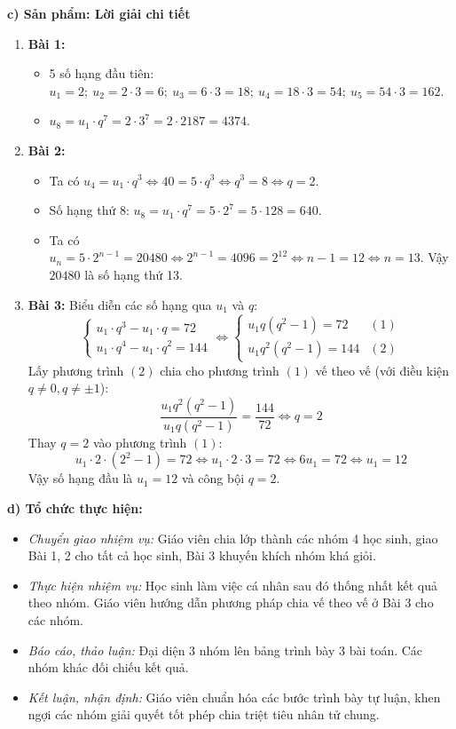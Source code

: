 \documentclass[12pt, a4paper]{article}
\begin{document}
\noindent \textbf{c) Sản phẩm: Lời giải chi tiết}
\begin{enumerate}[leftmargin=0.6cm]
    \item \textbf{Bài 1:}
    \begin{itemize}
        \item 5 số hạng đầu tiên: $u_1 = 2; \ u_2 = 2 \cdot 3 = 6; \ u_3 = 6 \cdot 3 = 18; \ u_4 = 18 \cdot 3 = 54; \ u_5 = 54 \cdot 3 = 162$.
        \item $u_8 = u_1 \cdot q^7 = 2 \cdot 3^7 = 2 \cdot 2187 = 4374$.
    \end{itemize}
    \item \textbf{Bài 2:}
    \begin{itemize}
        \item Ta có $u_4 = u_1 \cdot q^3 \iff 40 = 5 \cdot q^3 \iff q^3 = 8 \iff q = 2$.
        \item Số hạng thứ 8: $u_8 = u_1 \cdot q^7 = 5 \cdot 2^7 = 5 \cdot 128 = 640$.
        \item Ta có $u_n = 5 \cdot 2^{n-1} = 20480 \iff 2^{n-1} = 4096 = 2^{12} \iff n - 1 = 12 \iff n = 13$. Vậy $20480$ là số hạng thứ 13.
    \end{itemize}
    \item \textbf{Bài 3:}
    Biểu diễn các số hạng qua $u_1$ và $q$:
    $$\begin{cases} u_1 \cdot q^3 - u_1 \cdot q = 72 \\ u_1 \cdot q^4 - u_1 \cdot q^2 = 144 \end{cases} \iff \begin{cases} u_1 q (q^2 - 1) = 72 & (1) \\ u_1 q^2 (q^2 - 1) = 144 & (2) \end{cases}$$
    Lấy phương trình $(2)$ chia cho phương trình $(1)$ vế theo vế (với điều kiện $q \neq 0, q \neq \pm 1$):
    $$\dfrac{u_1 q^2 (q^2 - 1)}{u_1 q (q^2 - 1)} = \dfrac{144}{72} \iff q = 2$$
    Thay $q = 2$ vào phương trình $(1)$:
    $$u_1 \cdot 2 \cdot (2^2 - 1) = 72 \iff u_1 \cdot 2 \cdot 3 = 72 \iff 6u_1 = 72 \iff u_1 = 12$$
    Vậy số hạng đầu là $u_1 = 12$ và công bội $q = 2$.
\end{enumerate}

\noindent \textbf{d) Tổ chức thực hiện:}
\begin{itemize}[leftmargin=0.8cm]
    \item \textit{Chuyển giao nhiệm vụ:} Giáo viên chia lớp thành các nhóm 4 học sinh, giao Bài 1, 2 cho tất cả học sinh, Bài 3 khuyến khích nhóm khá giỏi.
    \item \textit{Thực hiện nhiệm vụ:} Học sinh làm việc cá nhân sau đó thống nhất kết quả theo nhóm. Giáo viên hướng dẫn phương pháp chia vế theo vế ở Bài 3 cho các nhóm.
    \item \textit{Báo cáo, thảo luận:} Đại diện 3 nhóm lên bảng trình bày 3 bài toán. Các nhóm khác đối chiếu kết quả.
    \item \textit{Kết luận, nhận định:} Giáo viên chuẩn hóa các bước trình bày tự luận, khen ngợi các nhóm giải quyết tốt phép chia triệt tiêu nhân tử chung.
\end{itemize}
\end{document}
